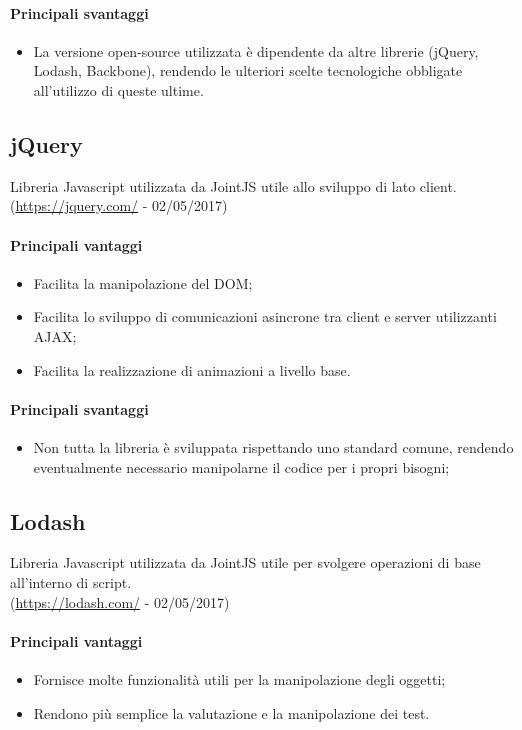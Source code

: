 \documentclass[../PianoDiQualifica.tex]{subfiles}
\begin{document}
			\paragraph{Principali svantaggi}
				\begin{itemize}
					\item La versione open-source utilizzata è dipendente da altre librerie
					(jQuery, Lodash, Backbone), rendendo le ulteriori scelte tecnologiche obbligate
					all'utilizzo di	queste ultime.
				\end{itemize}
		\subsection{jQuery}
			Libreria Javascript utilizzata da JointJS utile allo sviluppo di  lato client.\\
			(\url{https://jquery.com/} - 02/05/2017)
			\paragraph{Principali vantaggi}
			\begin{itemize}
					\item Facilita la manipolazione del DOM;
					\item Facilita lo sviluppo di comunicazioni asincrone tra client e server
					utilizzanti AJAX;
					\item Facilita la realizzazione di animazioni a livello base.
				\end{itemize}
			\paragraph{Principali svantaggi}
				\begin{itemize}
					\item Non tutta la libreria è sviluppata rispettando uno standard comune, rendendo
					eventualmente necessario manipolarne il codice per i propri bisogni;
				\end{itemize}
		\subsection{Lodash}
			Libreria Javascript utilizzata da JointJS utile per svolgere operazioni di base all'interno
			di script.\\
			(\url{https://lodash.com/} - 02/05/2017)
			\paragraph{Principali vantaggi}
			\begin{itemize}
					\item Fornisce molte funzionalità utili per la manipolazione degli oggetti;
					\item Rendono più semplice la valutazione e la manipolazione dei test.
				\end{itemize}
\end{document}
